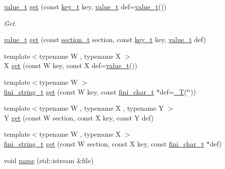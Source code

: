 \begin{DoxyCompactItemize}
\item 
\hyperlink{class_i_n_i_aeda858880798b4d54ba09bbd00ee1683}{value\+\_\+t} \hyperlink{class_i_n_i_a236ab0dc2059eb6180d1c611115492c3}{get} (const \hyperlink{class_i_n_i_acfa659efbac1eb0c62c1a910b0b09541}{key\+\_\+t} key, \hyperlink{class_i_n_i_aeda858880798b4d54ba09bbd00ee1683}{value\+\_\+t} def=\hyperlink{class_i_n_i_aeda858880798b4d54ba09bbd00ee1683}{value\+\_\+t}())
\begin{DoxyCompactList}\small\item\em Get. \end{DoxyCompactList}\item 
\hyperlink{class_i_n_i_aeda858880798b4d54ba09bbd00ee1683}{value\+\_\+t} \hyperlink{class_i_n_i_afe29b99fbf8804e9a4965e197ceed24e}{get} (const \hyperlink{class_i_n_i_a82551bff97cdd5c7ff183b24bd9b2188}{section\+\_\+t} section, const \hyperlink{class_i_n_i_acfa659efbac1eb0c62c1a910b0b09541}{key\+\_\+t} key, \hyperlink{class_i_n_i_aeda858880798b4d54ba09bbd00ee1683}{value\+\_\+t} def)
\item 
{\footnotesize template$<$typename W , typename X $>$ }\\X \hyperlink{class_i_n_i_ab55a726e7ed9346a98b032c6a0cb7d37}{get} (const W key, const X def=\hyperlink{class_i_n_i_aeda858880798b4d54ba09bbd00ee1683}{value\+\_\+t}())
\item 
{\footnotesize template$<$typename W $>$ }\\\hyperlink{_i_n_i_8h_a38d09ae9d340b15b8580649e578974db}{fini\+\_\+string\+\_\+t} \hyperlink{class_i_n_i_ab01b7aa55c1216246a329ccebae53f49}{get} (const W key, const \hyperlink{_i_n_i_8h_a03d482c4c241009c15ce537c9df118df}{fini\+\_\+char\+\_\+t} $\ast$def=\hyperlink{_i_n_i_8h_ae936e4c15227768f7da4e0951def89c8}{\+\_\+\+T}(\char`\"{}\char`\"{}))
\item 
{\footnotesize template$<$typename W , typename X , typename Y $>$ }\\Y \hyperlink{class_i_n_i_a237fc101e4977fa4f4e1de750c7e9aa3}{get} (const W section, const X key, const Y def)
\item 
{\footnotesize template$<$typename W , typename X $>$ }\\\hyperlink{_i_n_i_8h_a38d09ae9d340b15b8580649e578974db}{fini\+\_\+string\+\_\+t} \hyperlink{class_i_n_i_a4a2ca86ad6e5532a1fa5f8de4a71965f}{get} (const W section, const X key, const \hyperlink{_i_n_i_8h_a03d482c4c241009c15ce537c9df118df}{fini\+\_\+char\+\_\+t} $\ast$def)
\item 
void \hyperlink{class_i_n_i_aada51d135d18d4f67c3458f18d822883}{parse} (std\+::istream \&file)

\end{DoxyCompactItemize}
